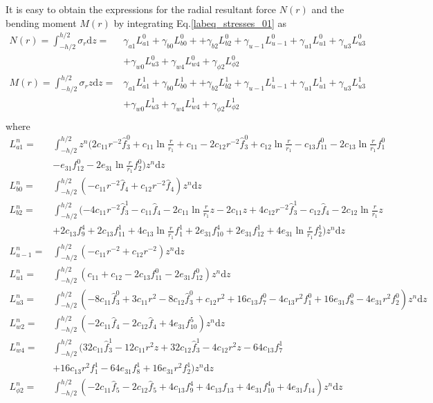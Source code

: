 \documentclass[12pt,sort&compress,fleqn,3p]{elsarticle}
\begin{document}
It is easy to obtain the expressions for the radial resultant force $N(r)$ and the bending moment ${M}(r)$
by integrating  Eq.\eqref{labeq_stresses_01} as 
\begin{equation}
\begin{split}\label{labeq_MN}
N(r)=\int_{-h/2}^{h/2}\sigma_{r}\mathrm{d}z=& \gamma_{a1}L^0_{a1} +\gamma_{b0}L^0_{b0}+ +\gamma_{b2}L^0_{b2}+\gamma_{u-1}L^0_{u-1}+\gamma_{u1}L^0_{u1} +\gamma_{u3}L^0_{u3} \\
&+ \gamma_{w0}L^0_{u3}  +\gamma_{w4}L^0_{w4} +\gamma_{\phi 2}L^0_{\phi 2} \\
M(r)=\int_{-h/2}^{h/2}\sigma_{r}z\mathrm{d}z=& \gamma_{a1}L^1_{a1} +\gamma_{b0}L^1_{b0}+ +\gamma_{b2}L^1_{b2}+\gamma_{u-1}L^1_{u-1}+\gamma_{u1}L^1_{u1} +\gamma_{u3}L^1_{u3}\\
&+ \gamma_{w0}L^1_{u3}  +\gamma_{w4}L^1_{w4} +\gamma_{\phi 2}L^1_{\phi 2} \\
\end{split}
\end{equation}
where
\begin{equation}\label{labeq_MN_L}
\begin{split}
L^n_{a1}= &\int_{-h/2}^{h/2}z^{n}( 2c_{11}r^{-2} \hat{f}^0_3  +  c_{11}\ln\frac{r}{r_1} + c_{11} -2c_{12}r^{-2}\hat{f}^0_3 + c_{12}\ln\frac{r}{r_1}    -c_{13}f^0_{11} -2c_{13}\ln\frac{r}{r_1} f^0_1  \\
&-e_{31}f^0_{12}  - 2e_{31}\ln\frac{r}{r_1}f^0_2 ) z^n \mathrm{d}z\\
L^n_{b0}= &\int_{-h/2}^{h/2}(  - c_{11}r^{-2}\hat{f}_4 + c_{12}r^{-2}\hat{f}_4)z^n\mathrm{d}z\\
L^n_{b2}=&\int_{-h/2}^{h/2}( -4c_{11}r^{-2}\hat{f}^1_3- c_{11}\hat{f}_4 -2c_{11}\ln\frac{r}{r_1}z -2c_{11}z + 4 c_{12}r^{-2}\hat{f}^1_3- c_{12}\hat{f}_4 -2c_{12}\ln\frac{r}{r_1}z\\
& +2 c_{13} f^4_9 + 2 c_{13} f^1_{11} + 4   c_{13}  \ln\frac{r}{r_1} f^1_1 + 2 e_{31}f^4_{10} + 2 e_{31}f^1_{12} + 4 e_{31}\ln\frac{r}{r_1}f^1_2   )z^n\mathrm{d}z\\
L^n_{u-1} =&\int_{-h/2}^{h/2}( -c_{11} r^{-2} + c_{12}r^{-2})z^n\mathrm{d}z\\
L^n_{u1} =&\int_{-h/2}^{h/2}( c_{11} + c_{12}  - 2c_{13}f^0_{11}  - 2e_{31}f^0_{12} )z^n\mathrm{d}z\\
L^n_{u3} =&\int_{-h/2}^{h/2}( -8c_{11}\hat{f}^0_3+  3c_{11}r^2 -8c_{12}\hat{f}^0_3 +  c_{12}r^2  + 16 c_{13}f^0_7 - 4c_{13}r^2f^0_1  +  16e_{31}f^0_{8} - 4e_{31}r^2f^0_2 )z^n\mathrm{d}z\\
L^n_{w2} =&\int_{-h/2}^{h/2}( -2c_{11}\hat{f}_4 -2c_{12}\hat{f}_4 + 4e_{31}f^5_{10} )z^n\mathrm{d}z\\
L^n_{w4}=&\int_{-h/2}^{h/2}(  32c_{11}\hat{f}^1_3 -12c_{11}r^2z +  32c_{12}\hat{f}^1_3 -4c_{12}r^2z   -64c_{13}f^1_7\\
 &+ 16c_{13}r^2f^1_1 -64e_{31}f^1_{8} + 16e_{31}r^2f^1_2     )z^n\mathrm{d}z\\
L^n_{\phi2} =&\int_{-h/2}^{h/2}(  -2c_{11}\hat{f}_5 -2c_{12}\hat{f}_5 +   4c_{13}f^4_{9}+ 4c_{13}f_{13}  +  4e_{31}f^4_{10} +4e_{31}f_{14} )z^n\mathrm{d}z\\
\end{split}
\end{equation}
\end{document}
